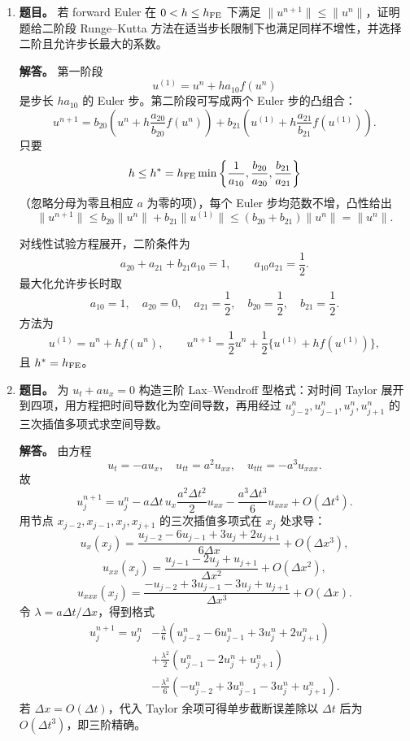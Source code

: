 ﻿\documentclass[UTF8,12pt]{ctexart}
\begin{document}
\begin{enumerate}[label=\textbf{\arabic*.},leftmargin=2.2em]
由算子范数定义，
\[
\|A\|_\infty=\max_i\sum_j |a_{ij}|.
\]
题设给出
\[
\sum_{j\ne i}|a_{ij}|\le a_{ii}-2.
\]
故每行绝对和
\[
\sum_j|a_{ij}|=a_{ii}+\sum_{j\ne i}|a_{ij}|
\le 2a_{ii}-2\le12.
\]
又 \(a_{ii}\ge2\)，所以
\[
2\le \|A\|_\infty\le12.
\]

若 \(A=A^T\)，Gershgorin 圆盘给出每个特征值 \(\lambda\) 满足
\[
a_{ii}-\sum_{j\ne i}|a_{ij}|\le\lambda\le
a_{ii}+\sum_{j\ne i}|a_{ij}|.
\]
故
\[
2\le\lambda\le12.
\]
于是
\[
2\le\|A\|_2\le12,\qquad
\frac1{12}\le\|A^{-1}\|_2\le\frac12.
\]

\item \textbf{题目。} 若 forward Euler 在 \(0<h\le h_{\rm FE}\) 下满足 \(\|u^{n+1}\|\le\|u^n\|\)，证明题给二阶段 Runge--Kutta 方法在适当步长限制下也满足同样不增性，并选择二阶且允许步长最大的系数。

\textbf{解答。} 第一阶段
\[
u^{(1)}=u^n+h a_{10}f(u^n)
\]
是步长 \(ha_{10}\) 的 Euler 步。第二阶段可写成两个 Euler 步的凸组合：
\[
u^{n+1}
=b_{20}\left(u^n+h\frac{a_{20}}{b_{20}}f(u^n)\right)
+b_{21}\left(u^{(1)}+h\frac{a_{21}}{b_{21}}f(u^{(1)})\right).
\]
只要
\[
h\le h^\ast=h_{\rm FE}
\min\left\{\frac1{a_{10}},\frac{b_{20}}{a_{20}},\frac{b_{21}}{a_{21}}\right\}
\]
（忽略分母为零且相应 \(a\) 为零的项），每个 Euler 步均范数不增，凸性给出
\[
\|u^{n+1}\|\le b_{20}\|u^n\|+b_{21}\|u^{(1)}\|
\le (b_{20}+b_{21})\|u^n\|=\|u^n\|.
\]

对线性试验方程展开，二阶条件为
\[
a_{20}+a_{21}+b_{21}a_{10}=1,\qquad a_{10}a_{21}=\frac12.
\]
最大化允许步长时取
\[
a_{10}=1,\quad a_{20}=0,\quad a_{21}=\frac12,\quad
b_{20}=\frac12,\quad b_{21}=\frac12.
\]
方法为
\[
u^{(1)}=u^n+h f(u^n),\qquad
u^{n+1}=\frac12u^n+\frac12\{u^{(1)}+h f(u^{(1)})\},
\]
且 \(h^\ast=h_{\rm FE}\)。

\item \textbf{题目。} 为 \(u_t+a u_x=0\) 构造三阶 Lax--Wendroff 型格式：对时间 Taylor 展开到四项，用方程把时间导数化为空间导数，再用经过 \(u_{j-2}^n,u_{j-1}^n,u_j^n,u_{j+1}^n\) 的三次插值多项式求空间导数。

\textbf{解答。} 由方程
\[
u_t=-au_x,\quad u_{tt}=a^2u_{xx},\quad u_{ttt}=-a^3u_{xxx}.
\]
故
\[
u^{n+1}_j=u_j^n-a\Delta t\,u_x
\frac{a^2\Delta t^2}{2}u_{xx}
-\frac{a^3\Delta t^3}{6}u_{xxx}+O(\Delta t^4).
\]
用节点 \(x_{j-2},x_{j-1},x_j,x_{j+1}\) 的三次插值多项式在 \(x_j\) 处求导：
\[
u_x(x_j)=\frac{u_{j-2}-6u_{j-1}+3u_j+2u_{j+1}}{6\Delta x}+O(\Delta x^3),
\]
\[
u_{xx}(x_j)=\frac{u_{j-1}-2u_j+u_{j+1}}{\Delta x^2}+O(\Delta x^2),
\]
\[
u_{xxx}(x_j)=\frac{-u_{j-2}+3u_{j-1}-3u_j+u_{j+1}}{\Delta x^3}+O(\Delta x).
\]
令 \(\lambda=a\Delta t/\Delta x\)，得到格式
\[
\begin{aligned}
u_j^{n+1}=u_j^n
&-\frac{\lambda}{6}(u_{j-2}^n-6u_{j-1}^n+3u_j^n+2u_{j+1}^n)\\
&+\frac{\lambda^2}{2}(u_{j-1}^n-2u_j^n+u_{j+1}^n)\\
&-\frac{\lambda^3}{6}(-u_{j-2}^n+3u_{j-1}^n-3u_j^n+u_{j+1}^n).
\end{aligned}
\]
若 \(\Delta x=O(\Delta t)\)，代入 Taylor 余项可得单步截断误差除以 \(\Delta t\) 后为 \(O(\Delta t^3)\)，即三阶精确。


\end{enumerate}
\end{document}
